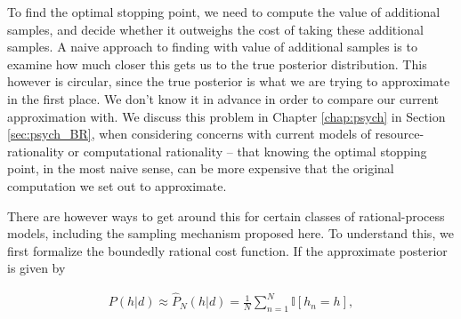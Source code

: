 To find the optimal stopping point, we need to compute the value of additional samples, and decide whether it outweighs the cost of taking these additional samples. A naive approach to finding with value of additional samples is to examine how much closer this gets us to the true posterior distribution. This however is circular, since the true posterior is what we are trying to approximate in the first place. We don't know it in advance in order to compare our current approximation with. We discuss this problem in Chapter \ref{chap:psych} in Section \ref{sec:psych_BR}, when considering concerns with current models of resource-rationality or computational rationality -- that knowing the optimal stopping point, in the most naive sense, can be more expensive that the original computation we set out to approximate. 

There are however ways to get around this for certain classes of rational-process models, including the sampling mechanism proposed here. To understand this, we first formalize the boundedly rational cost function. If the approximate posterior is given by

\begin{align}
P(h|d) \approx \hat{P}_N(h|d) = \frac{1}{N}\sum_{n=1}^N \mathbb{I}[h_n=h],
\end{align}

